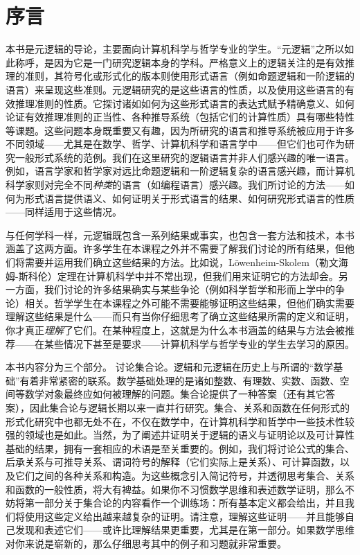 \chapter{序言}

本书是元逻辑的导论，主要面向计算机科学与哲学专业的学生。“元逻辑”之所以如此称呼，是因为它是一门研究逻辑本身的学科。严格意义上的逻辑关注的是有效推理的准则，其符号化或形式化的版本则使用形式语言（例如命题逻辑和一阶逻辑的语言）来呈现这些准则。元逻辑研究的是这些语言的性质，以及使用这些语言的有效推理准则的性质。它探讨诸如如何为这些形式语言的表达式赋予精确意义、如何论证有效推理准则的正当性、各种推导系统（包括它们的计算性质）具有哪些特性等课题。这些问题本身既重要又有趣，因为所研究的语言和推导系统被应用于许多不同领域——尤其是在数学、哲学、计算机科学和语言学中——但它们也可作为研究一般形式系统的范例。我们在这里研究的逻辑语言并非人们感兴趣的唯一语言。例如，语言学家和哲学家对远比命题逻辑和一阶逻辑复杂的语言感兴趣，而计算机科学家则对完全不同\emph{种类}的语言（如编程语言）感兴趣。我们所讨论的方法——如何为形式语言提供语义、如何证明关于形式语言的结果、如何研究形式语言的性质——同样适用于这些情况。

与任何学科一样，元逻辑既包含一系列结果或事实，也包含一套方法和技术，本书涵盖了这两方面。许多学生在本课程之外并不需要了解我们讨论的所有结果，但他们将需要并运用我们确立这些结果的方法。比如说，Löwenheim-Skolem（勒文海姆-斯科伦）定理在计算机科学中并不常出现，但我们用来证明它的方法却会。另一方面，我们讨论的许多结果确实与某些争论（例如科学哲学和形而上学中的争论）相关。哲学学生在本课程之外可能不需要能够证明这些结果，但他们确实需要理解这些结果是什么——而只有当你仔细思考了确立这些结果所需的定义和证明，你才真正\emph{理解}了它们。在某种程度上，这就是为什么本书涵盖的结果与方法会被推荐——在某些情况下甚至是要求——计算机科学与哲学专业的学生去学习的原因。

本书内容分为三个部分。 讨论集合论。逻辑和元逻辑在历史上与所谓的“数学基础”有着非常紧密的联系。数学基础处理的是诸如整数、有理数、实数、函数、空间等数学对象最终应如何被理解的问题。集合论提供了一种答案（还有其它答案），因此集合论与逻辑长期以来一直并行研究。集合、关系和函数在任何形式的形式化研究中也都无处不在，不仅在数学中，在计算机科学和哲学中一些技术性较强的领域也是如此。当然，为了阐述并证明关于逻辑的语义与证明论以及可计算性基础的结果，拥有一套相应的术语是至关重要的。例如，我们将讨论公式的集合、后承关系与可推导关系、谓词符号的解释（它们实际上是关系）、可计算函数，以及它们之间的各种关系和构造。为这些概念引入简记符号，并透彻思考集合、关系和函数的一般性质，将大有裨益。如果你不习惯数学思维和表述数学证明，那么不妨将第一部分关于集合论的内容看作一个训练场：所有基本定义都会给出，并且我们将使用这些定义给出越来越复杂的证明。请注意，理解这些证明——并且能够自己发现和表述它们——或许比理解结果更重要，尤其是在第一部分。如果数学思维对你来说是崭新的，那么仔细思考其中的例子和习题就非常重要。

